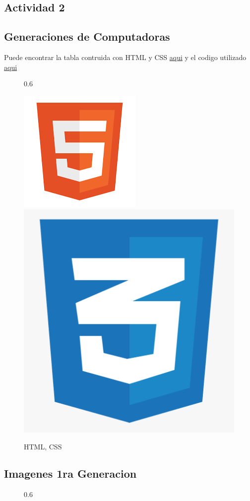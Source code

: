 \documentclass[11pt]{article}
\begin{document}
\begin{multicols}{2}

\section{Actividad 2}

  \subsection{Generaciones de Computadoras}
  
  Puede encontrar la tabla contruida con HTML y CSS \href{https://xo13o.csb.app/}{\underline{aqui}} y el codigo utilizado \href{https://codesandbox.io/s/xo13o}{aqui}
  \begin{figure}{0.6\linewidth}
  
  \centering
  \includegraphics[width=0.3\linewidth]{html.png}
  \includegraphics[width=0.3\linewidth]{css.png}
  \caption{HTML, CSS }
  
  \end{figure}


  \subsection{Imagenes 1ra Generacion}

  \begin{figure}{0.6\linewidth}
  

\end{figure}
\end{multicols}
\end{document}
